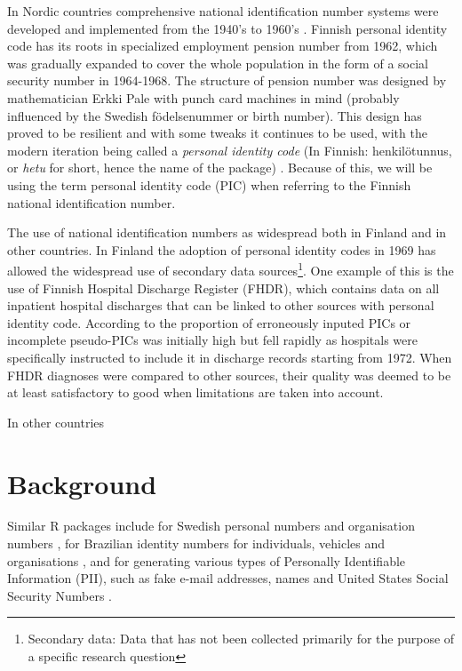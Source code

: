 In Nordic countries comprehensive national identification number systems were developed and implemented from the 1940's to 1960's \citep{watson2010}. Finnish personal identity code has its roots in specialized employment pension number from 1962, which was gradually expanded to cover the whole population in the form of a social security number in 1964-1968. The structure of pension number was designed by mathematician Erkki Pale with punch card machines in mind (probably influenced by the Swedish födelsenummer or birth number). This design has proved to be resilient and with some tweaks it continues to be used, with the modern iteration being called a \emph{personal identity code} (In Finnish: henkilötunnus, or \emph{hetu} for short, hence the name of the package) \citep{salste2021}. Because of this, we will be using the term personal identity code (PIC) when referring to the Finnish national identification number.

The use of national identification numbers as widespread both in Finland and in other countries. In Finland the adoption of personal identity codes in 1969 has allowed the widespread use of secondary data sources\footnote{Secondary data: Data that has not been collected primarily for the purpose of a specific research question}. One example of this is the use of Finnish Hospital Discharge Register (FHDR), which contains data on all inpatient hospital discharges that can be linked to other sources with personal identity code. According to \citet{reijosund} the proportion of erroneously inputed PICs or incomplete pseudo-PICs was initially high but fell rapidly as hospitals were specifically instructed to include it in discharge records starting from 1972. When FHDR diagnoses were compared to other sources, their quality was deemed to be at least satisfactory to good when limitations are taken into account.

In other countries 

\section{Background}

Similar R packages include  for Swedish personal numbers and organisation numbers \citep{sweidnumbr},  for Brazilian identity numbers for individuals, vehicles and organisations \citep{numbersbr}, and  for generating various types of Personally Identifiable Information (PII), such as fake e-mail addresses, names and United States Social Security Numbers \citep{generator}.

